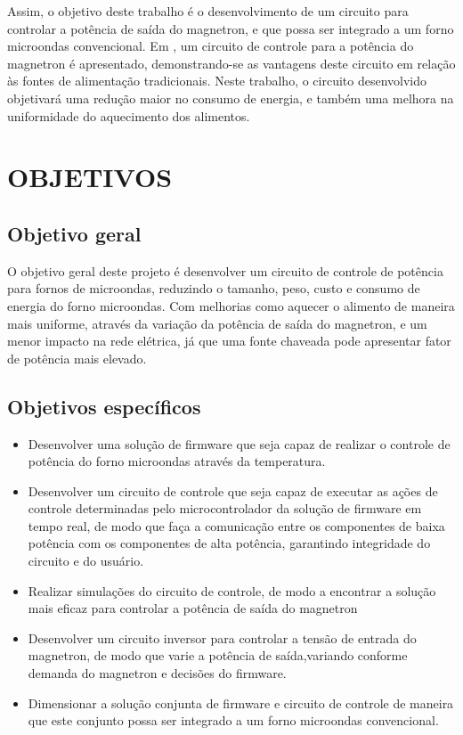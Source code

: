  Assim, o objetivo deste trabalho é o desenvolvimento de um circuito para controlar a potência de saída do magnetron, e que possa ser integrado a um forno microondas convencional. Em \cite{Hidenori1991}, um circuito de controle para a potência do magnetron é apresentado, demonstrando-se as vantagens deste circuito em relação às fontes de alimentação tradicionais. Neste trabalho, o circuito desenvolvido objetivará uma redução maior no consumo de energia, e também uma melhora na uniformidade do aquecimento dos alimentos.


\section{OBJETIVOS}
\label{sec:objetivos}


\subsection{Objetivo geral}
\label{sec:objetivosGerais}

O objetivo geral deste projeto é desenvolver um circuito de controle de potência para fornos de microondas, reduzindo o tamanho, peso, custo e consumo de energia do forno microondas. Com melhorias como aquecer o alimento de maneira mais uniforme, através da variação da potência de saída do magnetron, e um menor impacto na rede elétrica, já que uma fonte chaveada pode apresentar fator de potência mais elevado.

\subsection{Objetivos específicos}
\label{sec:objetivosEspecificos}

\begin{itemize}
    \item Desenvolver uma solução de  firmware que seja capaz de realizar o controle de potência do forno microondas através da temperatura. 
    \item Desenvolver um circuito de controle que seja capaz de executar as ações de controle determinadas pelo microcontrolador da solução de firmware em tempo real, de modo que faça a comunicação entre os componentes de baixa potência com os componentes de alta potência, garantindo integridade do circuito e do usuário. 
    \item Realizar simulações do circuito de controle, de modo a encontrar a solução mais eficaz para controlar a potência de saída do magnetron
    \item Desenvolver um circuito inversor para controlar a tensão de entrada do magnetron, de modo que varie a potência de saída,variando conforme demanda do magnetron e decisões do firmware.
    \item Dimensionar a solução conjunta de firmware e circuito de controle de maneira que este conjunto possa ser integrado a um forno microondas convencional.

\end{itemize}


